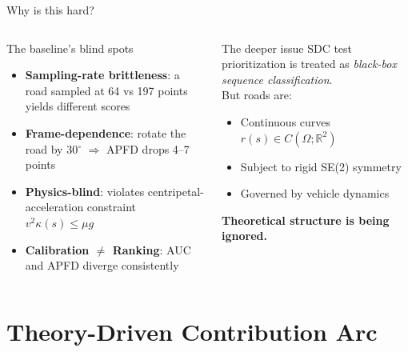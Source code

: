 \documentclass[aspectratio=169,10pt]{beamer}
\begin{document}
\begin{frame}{Why is this hard?}
\begin{columns}[T]
\begin{alertblock}{The baseline's blind spots}
\footnotesize
\begin{itemize}
  \item \textbf{Sampling-rate brittleness}: a road sampled at 64 vs 197 points yields different scores
  \item \textbf{Frame-dependence}: rotate the road by 30$^\circ$ $\Rightarrow$ APFD drops 4--7 points
  \item \textbf{Physics-blind}: violates centripetal-acceleration constraint $v^2 \kappa(s) \le \mu g$
  \item \textbf{Calibration $\ne$ Ranking}: AUC and APFD diverge consistently
\end{itemize}
\end{alertblock}

\begin{block}{The deeper issue}
\footnotesize
SDC test prioritization is treated as \emph{black-box sequence classification}. \\[4pt]
But roads are:
\begin{itemize}
  \item Continuous curves $r(s) \in C(\Omega; \mathbb{R}^2)$
  \item Subject to rigid SE(2) symmetry
  \item Governed by vehicle dynamics
\end{itemize}
\textbf{Theoretical structure is being ignored.}
\end{block}
\end{columns}
\end{frame}

\section{Theory-Driven Contribution Arc}
\end{document}

